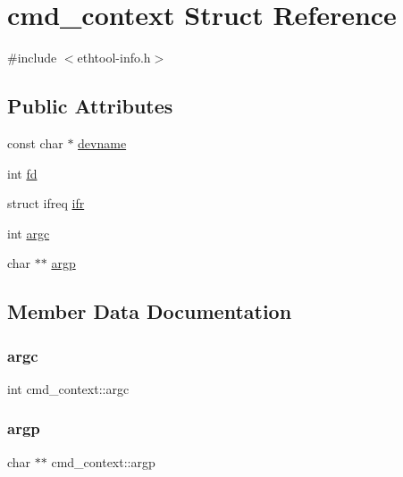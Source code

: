 \hypertarget{structcmd__context}{}\section{cmd\+\_\+context Struct Reference}
\label{structcmd__context}


{\ttfamily \#include $<$ethtool-\/info.\+h$>$}

\subsection*{Public Attributes}
\begin{DoxyCompactItemize}
\item 
const char $\ast$ \hyperlink{structcmd__context_ab8b7bd55de702a0928b0d27b7d7f46c4}{devname}
\item 
int \hyperlink{structcmd__context_a3482941a7d95d94958fd026e984aaad6}{fd}
\item 
struct ifreq \hyperlink{structcmd__context_a372549b7e45b707f07780719bc9f3b06}{ifr}
\item 
int \hyperlink{structcmd__context_a1aa1c9bed1f38cff4fd629b65a8cbca9}{argc}
\item 
char $\ast$$\ast$ \hyperlink{structcmd__context_a24ef49bb73e5c7212d3277860adce333}{argp}
\end{DoxyCompactItemize}


\subsection{Member Data Documentation}
\mbox{\label{structcmd__context_a1aa1c9bed1f38cff4fd629b65a8cbca9}} 
\subsubsection{\texorpdfstring{argc}{argc}}
{\footnotesize\ttfamily int cmd\+\_\+context\+::argc}

\mbox{\label{structcmd__context_a24ef49bb73e5c7212d3277860adce333}} 
\subsubsection{\texorpdfstring{argp}{argp}}
{\footnotesize\ttfamily char $\ast$$\ast$ cmd\+\_\+context\+::argp}

